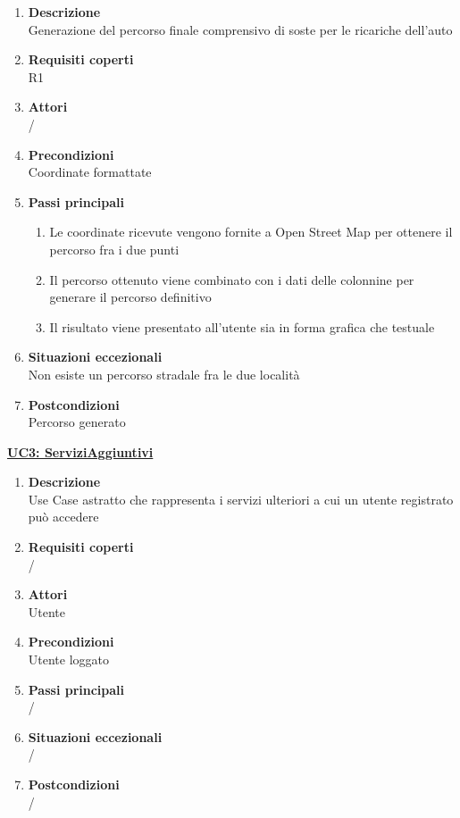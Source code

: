 \begin{enumerate}
\item\textbf{Descrizione} \\ Generazione del percorso finale comprensivo di soste per le ricariche dell'auto
\item\textbf{Requisiti coperti} \\ R1
\item\textbf{Attori} \\ /
\item\textbf{Precondizioni} \\ Coordinate formattate
\item\textbf{Passi principali}
    \begin{enumerate}
    \item Le coordinate ricevute vengono fornite a Open Street Map per ottenere il percorso fra i due punti
    \item Il percorso ottenuto viene combinato con i dati delle colonnine per generare il percorso definitivo
    \item Il risultato viene presentato all'utente sia in forma grafica che testuale
    \end{enumerate}
\item\textbf{Situazioni eccezionali} \\ Non esiste un percorso stradale fra le due località
\item\textbf{Postcondizioni} \\ Percorso generato
\end{enumerate}

\underline{\textbf{UC3: ServiziAggiuntivi}}
\begin{enumerate}
\item\textbf{Descrizione}\\
Use Case astratto che rappresenta i servizi ulteriori a cui un utente registrato può accedere
\item\textbf{Requisiti coperti}\\ /
\item\textbf{Attori}\\ Utente
\item\textbf{Precondizioni}\\ Utente loggato
\item\textbf{Passi principali}\\ /
\item\textbf{Situazioni eccezionali}\\ /
\item\textbf{Postcondizioni}\\ /
\end{enumerate}

